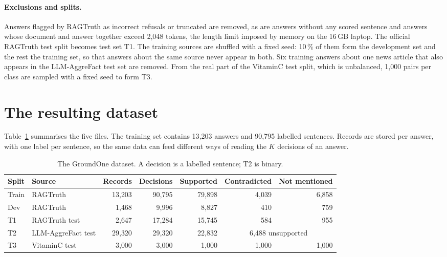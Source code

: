 \paragraph{Exclusions and splits.} Answers flagged by RAGTruth as incorrect refusals or truncated are removed, as are
answers without any scored sentence and answers whose document and answer together exceed 2{,}048 tokens, the length
limit imposed by memory on the 16\,GB laptop. The official RAGTruth test split becomes test set T1. The training
sources are shuffled with a fixed seed: 10\,\% of them form the development set and the rest the training set, so that
answers about the same source never appear in both. Six training answers about one news article that also appears in
the LLM-AggreFact test set are removed. From the real part of the VitaminC test split, which is unbalanced, 1{,}000 pairs
per class are sampled with a fixed seed to form T3.

\section{The resulting dataset}
\label{sec:data-result}

Table~\ref{tab:data-splits} summarises the five files. The training set contains 13{,}203 answers and 90{,}795
labelled sentences. Records are stored per answer, with one label per sentence, so the same data can feed different
ways of reading the $K$ decisions of an answer.

\begin{table}[htbp]
\centering
\caption{The GroundOne dataset. A decision is a labelled sentence; T2 is binary.}
\label{tab:data-splits}
\small
\begin{adjustbox}{max width=\textwidth}
\begin{tabular}{@{}llrrrrr@{}}
\toprule
Split & Source & Records & Decisions & Supported & Contradicted & Not mentioned \\
\midrule
Train & RAGTruth & 13{,}203 & 90{,}795 & 79{,}898 & 4{,}039 & 6{,}858 \\
Dev & RAGTruth & 1{,}468 & 9{,}996 & 8{,}827 & 410 & 759 \\
T1 & RAGTruth test & 2{,}647 & 17{,}284 & 15{,}745 & 584 & 955 \\
T2 & LLM-AggreFact test & 29{,}320 & 29{,}320 & 22{,}832 & \multicolumn{2}{c}{6{,}488 unsupported} \\
T3 & VitaminC test & 3{,}000 & 3{,}000 & 1{,}000 & 1{,}000 & 1{,}000 \\
\bottomrule
\end{tabular}
\end{adjustbox}
\end{table}

